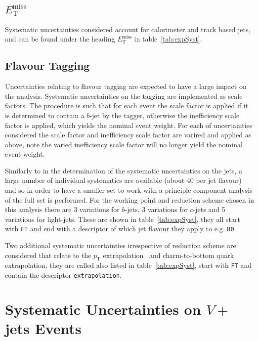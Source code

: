 \subsection{$E_{\mathrm{T}}^{\text{miss}}$}

Systematic uncertainties considered account for calorimeter and track based
jets, and can be found under the heading $E_{\mathrm{T}}^{\text{miss}}$ in
table~\ref{tab:expSyst}.

\subsection{Flavour Tagging}

Uncertainties relating to flavour tagging are expected to have a large impact on
the analysis. Systematic uncertainties on the tagging are implemented as scale
factors. The procedure is such that for each event the scale factor is applied
if it is determined to contain a $b$-jet by the tagger, otherwise the
inefficiency scale factor is applied, which yields the nominal event weight. For
each of uncertainties considered the scale factor and inefficiency scale factor
are varired and applied as above, note the varied inefficiency scale factor will
no longer yield the nominal event weight.

Similarly to in the determination of the systematic uncertainties on the jets, a
large number of individual systematics are available (about 40 per jet flavour)
and so in order to have a smaller set to work with a principle component
analysis of the full set is performed. For the working point and reduction
scheme chosen in this analysis there are 3 variations for $b$-jets, 3 variations
for $c$-jets and 5 variations for light-jets. These are shown in
table~\ref{tab:expSyst}, they all start with \texttt{FT} and end with a
descriptor of which jet flavour they apply to e.g. \texttt{B0}.

Two additional systematic uncertainties irrespective of reduction scheme are
considered that relate to the $p_{\mathrm{T}}$
extrapolation~\cite{BTaggingExtrap2015} and charm-to-bottom quark extrapolation,
they are called also listed in table~\ref{tab:expSyst}, start with \texttt{FT}
and contain the descriptor \texttt{extrapolation}.

\section{Systematic Uncertainties on $V+$jets Events}
\label{sec:vjets}

